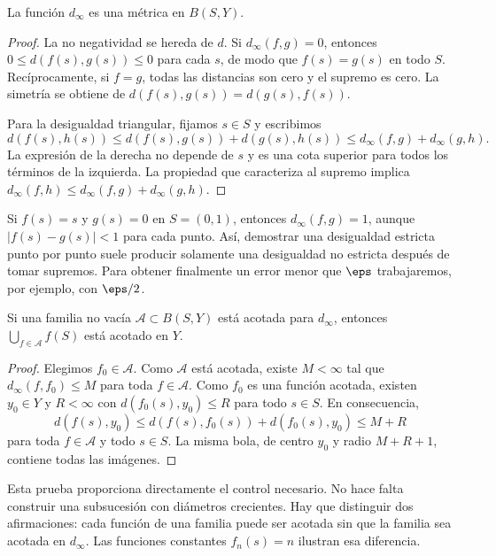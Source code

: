 \begin{proposicion}\label{ch25:metrica}
La función $d_\infty$ es una métrica en $B(S,Y)$.
\end{proposicion}
\begin{proof}
La no negatividad se hereda de $d$. Si $d_\infty(f,g)=0$, entonces
$0\le d(f(s),g(s))\le 0$ para cada $s$, de modo que $f(s)=g(s)$ en todo $S$. Recíprocamente, si $f=g$, todas las distancias son cero y el supremo es cero. La simetría se obtiene de $d(f(s),g(s))=d(g(s),f(s))$.

Para la desigualdad triangular, fijamos $s\in S$ y escribimos
\[
 d(f(s),h(s))\le d(f(s),g(s))+d(g(s),h(s))
 \le d_\infty(f,g)+d_\infty(g,h).
\]
La expresión de la derecha no depende de $s$ y es una cota superior para todos los términos de la izquierda. La propiedad que caracteriza al supremo implica
$d_\infty(f,h)\le d_\infty(f,g)+d_\infty(g,h)$.
\end{proof}

\begin{observacion}
Si $f(s)=s$ y $g(s)=0$ en $S=(0,1)$, entonces $d_\infty(f,g)=1$, aunque $|f(s)-g(s)|<1$ para cada punto. Así, demostrar una desigualdad estricta punto por punto suele producir solamente una desigualdad no estricta después de tomar supremos. Para obtener finalmente un error menor que $\eps$ trabajaremos, por ejemplo, con $\eps/2$.
\end{observacion}

\begin{lema}\label{ch25:unionacotada}
Si una familia no vacía $\mathcal A\subset B(S,Y)$ está acotada para $d_\infty$, entonces $\bigcup_{f\in\mathcal A}f(S)$ está acotado en $Y$.
\end{lema}
\begin{proof}
Elegimos $f_0\in\mathcal A$. Como $\mathcal A$ está acotada, existe $M<\infty$ tal que $d_\infty(f,f_0)\le M$ para toda $f\in\mathcal A$. Como $f_0$ es una función acotada, existen $y_0\in Y$ y $R<\infty$ con $d(f_0(s),y_0)\le R$ para todo $s\in S$. En consecuencia,
\[
 d(f(s),y_0)\le d(f(s),f_0(s))+d(f_0(s),y_0)\le M+R
\]
para toda $f\in\mathcal A$ y todo $s\in S$. La misma bola, de centro $y_0$ y radio $M+R+1$, contiene todas las imágenes.
\end{proof}

Esta prueba proporciona directamente el control necesario. No hace falta construir una subsucesión con diámetros crecientes. Hay que distinguir dos afirmaciones: cada función de una familia puede ser acotada sin que la familia sea acotada en $d_\infty$. Las funciones constantes $f_n(s)=n$ ilustran esa diferencia.

